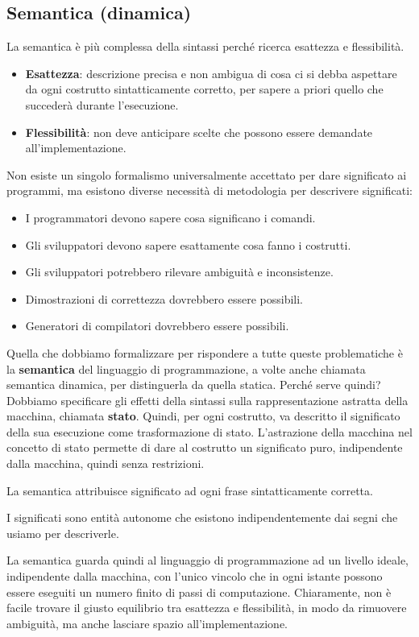 \documentclass[oneside,a4paper,11pt]{book}
\theoremstyle{italicstyle}
\theoremstyle{normStyle}
\begin{document}
\subsection{Semantica (dinamica)}
La semantica è più complessa della sintassi perché ricerca esattezza e flessibilità.
\begin{itemize}
  \item \textbf{Esattezza}: descrizione precisa e non ambigua di cosa ci si 
  debba aspettare da ogni costrutto sintatticamente corretto, per sapere a priori 
  quello che succederà durante l'esecuzione.
  \item \textbf{Flessibilità}: non deve anticipare scelte che possono essere 
  demandate all'implementazione.
\end{itemize}
Non esiste un singolo formalismo universalmente accettato per dare significato ai 
programmi, ma esistono diverse necessità di metodologia per descrivere significati:
\begin{itemize}
  \item I programmatori devono sapere cosa significano i comandi.
  \item Gli sviluppatori devono sapere esattamente cosa fanno i costrutti.
  \item Gli sviluppatori potrebbero rilevare ambiguità e inconsistenze.
  \item Dimostrazioni di correttezza dovrebbero essere possibili.
  \item Generatori di compilatori dovrebbero essere possibili. 
\end{itemize}
Quella che dobbiamo formalizzare per rispondere a tutte queste problematiche 
è la \textbf{semantica} del linguaggio di programmazione, a volte anche chiamata 
semantica dinamica, per distinguerla da quella statica. Perché serve quindi? 
Dobbiamo specificare gli effetti della sintassi sulla rappresentazione astratta 
della macchina, chiamata \textbf{stato}. Quindi, per ogni costrutto, va descritto 
il significato della sua esecuzione come trasformazione di stato. L'astrazione della 
macchina nel concetto di stato permette di dare al costrutto un significato puro, indipendente 
dalla macchina, quindi senza restrizioni.
\begin{tcolorbox}[title={Semantica}]
La semantica attribuisce significato ad ogni frase sintatticamente corretta.
\end{tcolorbox}
\begin{tcolorbox}[title={Siginficati}]
I significati sono entità autonome che esistono indipendentemente dai segni 
che usiamo per descriverle.
\end{tcolorbox}
La semantica guarda quindi al linguaggio di programmazione ad un livello ideale, indipendente
dalla macchina, con l'unico vincolo che in ogni istante possono essere eseguiti un numero finito di passi di 
computazione. Chiaramente, non è facile trovare il giusto equilibrio tra esattezza e flessibilità, 
in modo da rimuovere ambiguità, ma anche lasciare spazio all'implementazione.
\end{document}
